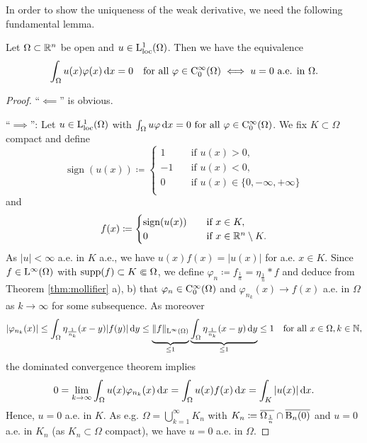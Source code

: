 In order to show the uniqueness of the weak derivative, we need the following fundamental lemma.

\begin{lem}
  \label{lem:fundamental}
  Let $\Omega \subset \mathbb{R}^n$ be open and $u \in \mathrm{L}_{\operatorname{loc}}^1(\Omega)$.
  Then we have the equivalence
  $$
  \int_\Omega u(x) \varphi(x) \, {\operatorname{d}\!{x}} = 0 \quad\text{for all } \varphi \in \mathrm{C}_0^\infty(\Omega) \iff u = 0 \text{ a.e. in } \Omega.
  $$
\end{lem}

\begin{proof}
  ``$\impliedby$'' is obvious.

  ``$\implies$'': Let $u \in \mathrm{L}^1_{\operatorname{loc}}(\Omega)$ with $\int_\Omega u\varphi \, {\operatorname{d}\!{x}} = 0 \text{ for all } \varphi \in \mathrm{C}_0^\infty(\Omega)$.
We fix $K \subset \Omega$ compact and define
$$
\operatorname{sign}(u(x)) \coloneqq 
\begin{cases} 
  1 &\quad\text{if } u(x) > 0, \\
  -1 &\quad\text{if } u(x) <  0, \\
  0 &\quad\text{if } u(x) \in \{ 0, -\infty, +\infty\} \\
\end{cases}
$$
and
$$
f(x) \coloneqq \begin{cases} \operatorname{sign}(u(x)) &\quad\text{if } x \in K, \\ 0  &\quad\text{if } x \in \mathbb{R}^n \setminus K. \end{cases}
$$
As $|u| < \infty$ a.e. in $K$ a.e., we have $u(x)f(x) = |u(x)|$ for a.e. $x \in K$.
Since $f \in \mathrm{L}^\infty(\Omega)$ with $\operatorname{supp}(f) \subset K \Subset \Omega$, we define $\varphi_n \coloneqq f_{\frac{1}{n}} = \eta_{\frac{1}{n}} \ast f$ and deduce from Theorem \ref{thm:mollifier} a), b) that $\varphi_n \in \mathrm{C}_0^\infty(\Omega)$ and $\varphi_{n_k}(x) \to f(x)$ a.e. in $\Omega$ as $k \to \infty$ for some subsequence.
As moreover
$$
|\varphi_{n_k}(x)| 
\leq \int_\Omega \eta_{\frac{1}{n_k}}(x - y) |f(y)| \, {\operatorname{d}\!{y}}
\leq \underbrace{\vphantom{\int_\Omega}\|f\|_{\mathrm{L}^\infty(\Omega)}}_{\leq 1} \underbrace{ \int_\Omega \eta_{\frac{1}{n_k}} (x - y) \, {\operatorname{d}\!{y}}}_{\leq 1}
\leq 1 \quad\text{for all } x \in \Omega, k \in \mathbb{N},
$$
the dominated convergence theorem implies
$$
0 = \lim_{k \to \infty} \int_\Omega u(x) \varphi_{n_k}(x) \, {\operatorname{d}\!{x}} 
= \int_\Omega u(x) f(x) \, {\operatorname{d}\!{x}} = \int_K |u(x)| \, {\operatorname{d}\!{x}}.
$$
Hence, $u = 0$ a.e. in $K$.
As e.g. $\Omega = \bigcup_{k = 1}^\infty K_n$ with $K_n \coloneqq \overline{\Omega_{\frac{1}{n}}} \cap \overline{\mathrm{B}_n(0)}$ and $u = 0$ a.e. in $K_n$ (as $K_n \subset \Omega$ compact), we have $u = 0$ a.e. in $\Omega$.
\end{proof}

